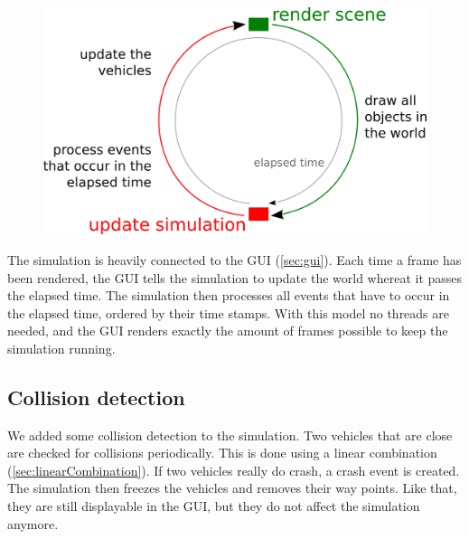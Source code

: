 \begin{figure}[H]
\begin{center}
\includegraphics[scale=0.5]{images/simulationprocess.png}
\end{center}
\end{figure}

\noindent The simulation is heavily connected to the GUI (\ref{sec:gui}). Each
time a frame has been rendered, the GUI tells the simulation to update the 
world whereat it passes the elapsed time. The simulation then processes all
events that have to occur in the elapsed time, ordered by their time stamps.
With this model no threads are needed, and the GUI renders exactly the amount
of frames possible to keep the simulation running.

\subsection{Collision detection}

We added some collision detection to the simulation. Two vehicles
that are close are checked for collisions periodically. This is done
using a linear combination (\ref{sec:linearCombination}). If two
vehicles really do crash, a crash event is created. The simulation
then freezes the vehicles and removes their way points. Like that, they
are still displayable in the GUI, but they do not affect the 
simulation anymore.

